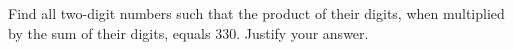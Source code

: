 Find all two-digit numbers such that the product of their digits, when multiplied by the sum of their digits, equals $330$. Justify your answer.
